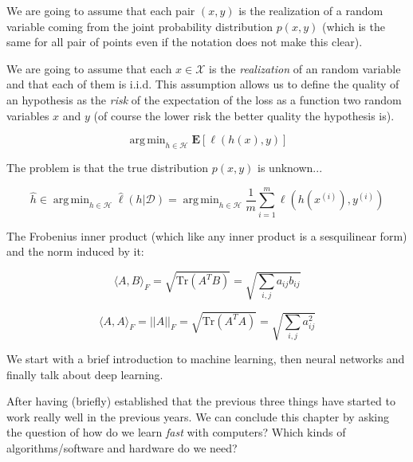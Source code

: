\documentclass{report}
\newcommand{\argmin}{\mathop{\mathrm{arg\,min}}}
\newcommand{\trace}{\mathrm{Tr}}
\begin{document}
We are going to assume that each pair $(x, y)$ is the realization of a random
variable coming from the joint probability distribution $p(x, y)$ (which is the
same for all pair of points even if the notation does not make this clear).

We are going to assume that each $x \in \mathcal X$ is the \emph{realization} of
an random variable and that each of them is i.i.d. This assumption allows us to
define the quality of an hypothesis as the \emph{risk} of the expectation of the
loss as a function two random variables $x$ and $y$ (of course the lower risk
the better quality the hypothesis is).

\begin{displaymath}
	\argmin_{h \in \mathcal H} \mathbf E [\ell(h(x), y)]
\end{displaymath}

The problem is that the true distribution $p(x, y)$ is unknown...

\begin{displaymath}
	\hat h \in \argmin_{h \in \mathcal H} \hat \ell(h|\mathcal D)
	= \argmin_{h \in \mathcal H} \frac 1 m \sum_{i=1}^m \ell(h(x^{(i)}), y^{(i)})
\end{displaymath}

The Frobenius inner product (which like any inner product is a sesquilinear
form) and the norm induced by it:

\begin{equation}
	\langle A,B \rangle_F = \sqrt{\trace(A^TB)} = \sqrt{\sum_{i,j} a_{ij}b_{ij}}
\end{equation}

\begin{equation}
	\langle A,A \rangle_F = ||A||_F = \sqrt{\trace(A^TA)} = \sqrt{\sum_{i,j} a_{ij}^2}
\end{equation}


We start with a brief introduction to machine learning, then neural networks and
finally talk about deep learning.

After having (briefly) established that the previous three things have started
to work really well in the previous years. We can conclude this chapter by
asking the question of how do we learn \emph{fast} with computers? Which kinds
of algorithms/software and hardware do we need?
\end{document}
